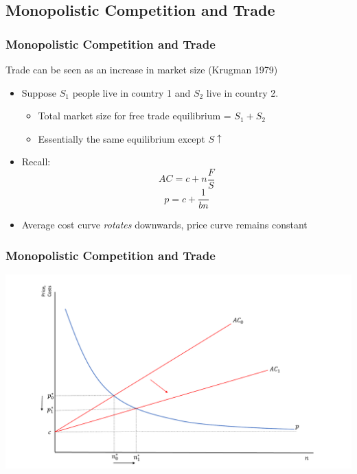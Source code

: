 \documentclass{beamer}
\begin{document}
\subsection{Monopolistic Competition and Trade}
\begin{frame}
	\frametitle{Monopolistic Competition and Trade}
	Trade can be seen as an increase in market size (Krugman 1979)
	\begin{itemize}
		\item Suppose $S_1$ people live in country 1 and $S_2$ live in country 2.
			\begin{itemize}
				\item Total market size for free trade equilibrium = $S_1 + S_2$
				\item Essentially the same equilibrium except $S\uparrow$
			\end{itemize}
		\item Recall:
		$$AC=c+n\frac{F}{S}$$
		$$p=c+\frac{1}{bn}$$
		\item Average cost curve \emph{rotates} downwards, price curve remains constant
	\end{itemize}
	
\end{frame}

\begin{frame}
	\frametitle{Monopolistic Competition and Trade}
	\includegraphics[scale=0.32]{SL2_8.pdf}
\end{frame}
\end{document}
